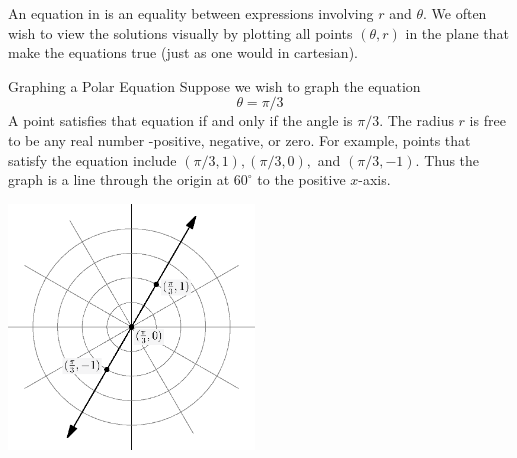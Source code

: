 An equation in  is an equality between expressions involving $r$ and $\theta$.  We often wish to view the solutions visually by plotting all points $\left(\theta, r\right)$ in the plane that make the equations true (just as one would in cartesian). 

\begin{example}{Graphing a Polar Equation}
Suppose we wish to graph the equation $$\theta=\pi/3 $$
A point satisfies that equation if and only if the angle is $\pi/3$.  The radius $r$ is free to be any real number -positive, negative, or zero.  For example, points that satisfy the equation include $(\pi/3,1), (\pi/3,0),$ and $(\pi/3,-1)$.  Thus the graph is a line through the origin at $60^\circ$ to the positive $x$-axis.


	\begin{center}
		\includegraphics[width=185pt]{ChapterCalcIII/Figures/linepolargraph.eps}
	\end{center}
\end{example}


